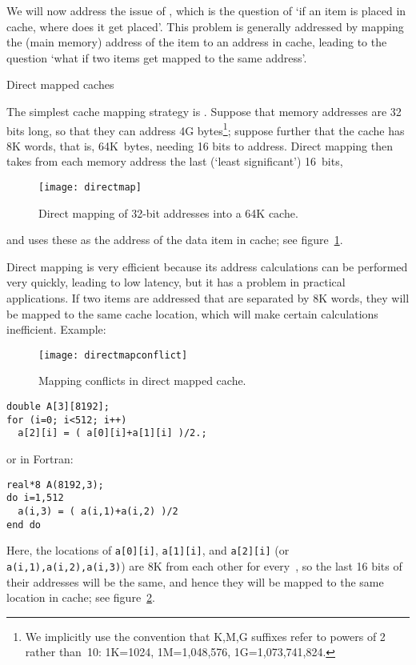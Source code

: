 We will now address the issue
of , which is the question of `if
an item is placed in cache, where does it get placed'. This problem is
generally addressed by mapping the (main memory) address of the item
to an address in cache, leading to the question `what if two items get
mapped to the same address'.

 {Direct mapped caches}
\label{sec:directmap}

The simplest cache mapping strategy is . Suppose that memory addresses are 32 bits long, so that
they can address 4G bytes\footnote
  {We implicitly use the convention
  that K,M,G suffixes refer to powers of 2 rather than~10: 1K=1024,
  1M=1,048,576, 1G=1,073,741,824.}; suppose further that the
cache has 8K words, that is, 64K~bytes, needing 16 bits to address.
Direct mapping then takes from each memory address the last (`least
significant') 16~bits,
\begin{figure}[ht]
  \texttt{[image: directmap]}
  \caption{Direct mapping of 32-bit addresses into a 64K cache.}
  \label{fig:directmap}
\end{figure}
and uses these as the address of the data item in cache; see figure~\ref{fig:directmap}.

Direct mapping is very efficient because its address calculations
can be performed very quickly, leading to low latency, but it
has a problem in practical applications. If two items are addressed
that are separated by 8K words, they will be mapped to the same cache
location, which will make certain calculations inefficient. Example:
%
\begin{figure}[ht]
  \texttt{[image: directmapconflict]}
  \caption{Mapping conflicts in direct mapped cache.}
  \label{fig:directconflict}
\end{figure}
%
\begin{lstlisting}
double A[3][8192];
for (i=0; i<512; i++)
  a[2][i] = ( a[0][i]+a[1][i] )/2.;
\end{lstlisting}
or in Fortran:
\begin{lstlisting}
real*8 A(8192,3);
do i=1,512
  a(i,3) = ( a(i,1)+a(i,2) )/2
end do
\end{lstlisting}
Here, the locations of \texttt{a[0][i]}, \texttt{a[1][i]}, and
\texttt{a[2][i]} (or \texttt{a(i,1),a(i,2),a(i,3)})
are 8K from each other for every~, so the last
16 bits of their addresses will be the same, and hence they will
be mapped to the same location in cache; see figure~\ref{fig:directconflict}.

